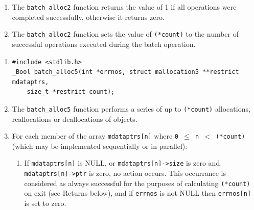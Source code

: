 \documentclass[wd]{isov2}
\begin{document}
{\begin{enumerate}
\begin{verbatim}
_Bool batch_alloc2(int *errnos, struct mallocation2 **restrict mdataptrs,
    size_t *restrict count, size_t alignment, size_t reserve, uintmax_t flags);
{
    size_t n, maxn=*count;
    /* Note that some implementations use malloc for variable length
       arrays: this may induce recursion. */
    struct mallocation5 mdata[maxn], *mdata5ptrs[maxn];
    for(n=0; n<maxn; n++)
    {
        if((mdata5ptrs[n]=mdataptrs[n] ? mdata+n : NULL))
        {
            mdata[n].ptr=mdataptrs[n]->ptr;
            mdata[n].size=mdataptrs[n]->size;
            mdata[n].alignment=alignment;
            mdata[n].reserve=reserve;
            mdata[n].flags=flags;
        }
    }
    batch_alloc5(errnos, mdata5ptrs, count);
    for(n=0; n<maxn; n++)
    {
        if(mdataptrs[n])
        {
            mdataptrs[n]->ptr=mdata[n].ptr;
            mdataptrs[n]->size=mdata[n].size;
        }
    }
    return *count==maxn;
}
\end{verbatim}
\item The \texttt{batch\_alloc2} function returns the value of 1 if all operations were completed successfully, otherwise it returns zero.
\item The \texttt{batch\_alloc2} function sets the value of \texttt{(*count)} to the number of successful operations executed during the batch operation.
\end{enumerate}

\begin{enumerate}
\renewcommand{\theenumi}{\arabic{enumi}}
\item \begin{verbatim}
#include <stdlib.h>
_Bool batch_alloc5(int *errnos, struct mallocation5 **restrict mdataptrs,
    size_t *restrict count);
\end{verbatim}
\item The \texttt{batch\_alloc5} function performs a series of up to \texttt{(*count)} allocations, reallocations or deallocations of objects.
\item For each member of the array \texttt{mdataptrs[n]} where \texttt{0 $\le$ n $<$ (*count)} (which may be implemented sequentially or in parallel):
\begin{enumerate}
\renewcommand{\theenumii}{\alph{enumii}}
\item If \texttt{mdataptrs[n]} is NULL, or \texttt{mdataptrs[n]->size} is zero and \texttt{mdataptrs[n]->ptr} is zero, no action occurs. This occurrance is considered as always successful for the purposes of calculating \texttt{(*count)} on exit (see Returns below), and if \texttt{errnos} is not NULL then \texttt{errnos[n]} is set to zero.


\end{enumerate}
\end{enumerate}}
\end{document}
